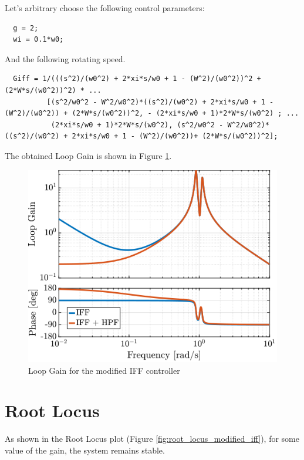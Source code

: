 \documentclass[a4paper, 10pt, DIV=12, parskip=full]{scrreprt}
\begin{document}
Let's arbitrary choose the following control parameters:
\begin{verbatim}
  g = 2;
  wi = 0.1*w0;
\end{verbatim}

And the following rotating speed.
\begin{verbatim}
  Giff = 1/(((s^2)/(w0^2) + 2*xi*s/w0 + 1 - (W^2)/(w0^2))^2 + (2*W*s/(w0^2))^2) * ...
          [(s^2/w0^2 - W^2/w0^2)*((s^2)/(w0^2) + 2*xi*s/w0 + 1 - (W^2)/(w0^2)) + (2*W*s/(w0^2))^2, - (2*xi*s/w0 + 1)*2*W*s/(w0^2) ; ...
           (2*xi*s/w0 + 1)*2*W*s/(w0^2), (s^2/w0^2 - W^2/w0^2)*((s^2)/(w0^2) + 2*xi*s/w0 + 1 - (W^2)/(w0^2))+ (2*W*s/(w0^2))^2];
\end{verbatim}

The obtained Loop Gain is shown in Figure \ref{fig:loop_gain_modified_iff}.
\begin{figure}[htbp]
\centering
\includegraphics[scale=1]{figs/loop_gain_modified_iff.png}
\caption{\label{fig:loop_gain_modified_iff}Loop Gain for the modified IFF controller}
\end{figure}

\section{Root Locus}
\label{sec:org911f45b}
As shown in the Root Locus plot (Figure \ref{fig:root_locus_modified_iff}), for some value of the gain, the system remains stable.
\end{document}
